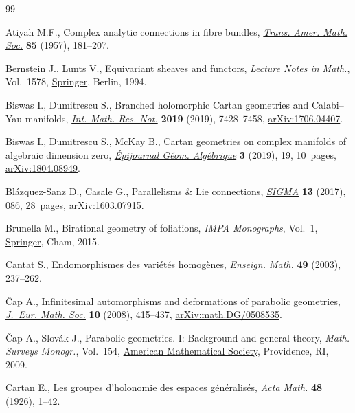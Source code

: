 \documentclass[10pt,a4paper]{amsart}
\numberwithin{equation}{section}
\begin{document}
\begin{thebibliography}{99}
\footnotesize\itemsep=0pt

Atiyah M.F., Complex analytic connections in fibre bundles, \href{https://doi.org/10.2307/1992969}{\textit{Trans.
 Amer. Math. Soc.}} \textbf{85} (1957), 181--207.

Bernstein J., Lunts V., Equivariant sheaves and functors, \textit{Lecture Notes
 in Math.}, Vol.~1578, \href{https://doi.org/10.1007/BFb0073549}{Springer}, Berlin, 1994.

Biswas I., Dumitrescu S., Branched holomorphic {C}artan geometries and
 {C}alabi--{Y}au manifolds, \href{https://doi.org/10.1093/imrn/rny003}{\textit{Int. Math. Res. Not.}} \textbf{2019}
 (2019), 7428--7458, \href{https://arxiv.org/abs/1706.04407}{arXiv:1706.04407}.

Biswas I., Dumitrescu S., McKay B., Cartan geometries on complex manifolds of
 algebraic dimension zero, \href{https://doi.org/10.46298/epiga.2019.volume3.4460}{\textit{\'Epijournal G\'eom. Alg\'ebrique}}
 \textbf{3} (2019), 19, 10~pages, \href{https://arxiv.org/abs/1804.08949}{arXiv:1804.08949}.

Bl\'azquez-Sanz D., Casale G., Parallelisms \& {L}ie connections,
  \href{https://doi.org/10.3842/SIGMA.2017.086}{\textit{SIGMA}} \textbf{13} (2017), 086, 28~pages, \href{https://arxiv.org/abs/1603.07915}{arXiv:1603.07915}.

Brunella M., Birational geometry of foliations, \textit{IMPA Monographs},
 Vol.~1, \href{https://doi.org/10.1007/978-3-319-14310-1}{Springer}, Cham, 2015.

Cantat S., Endomorphismes des vari\'et\'es homog\`enes, \href{https://doi.org/10.1007/978-3-319-14310-1}{\textit{Enseign. Math.}}
 \textbf{49} (2003), 237--262.

\v{C}ap A., Infinitesimal automorphisms and deformations of parabolic
 geometries, \href{https://doi.org/10.4171/JEMS/116}{\textit{J.~Eur. Math. Soc.}} \textbf{10} (2008), 415--437,
 \href{https://arxiv.org/abs/math.DG/0508535}{arXiv:math.DG/0508535}.

\v{C}ap A., Slov\'ak J., Parabolic geometries. {I}: Background and general
 theory, \textit{Math. Surveys Monogr.}, Vol.~154, \href{https://doi.org/10.1090/surv/154}{American Mathematical Society}, Providence, RI, 2009.

Cartan E., Les groupes d'holonomie des espaces g\'en\'eralis\'es,  \href{https://doi.org/10.1007/BF02629755}{\textit{Acta
 Math.}} \textbf{48} (1926), 1--42.


\end{thebibliography}
\end{document}
